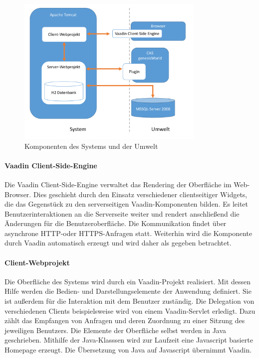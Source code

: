 \begin{figure}[htbp]
\centering
  \includegraphics[width=0.8\textwidth, width=0.8\textwidth]{pics/Konzept_architektur.pdf}
\caption{Komponenten des Systems und der Umwelt}
\label{konzept_architektur}
\end{figure} 

\paragraph{Vaadin Client-Side-Engine}

Die Vaadin Client-Side-Engine verwaltet das Rendering der Oberfläche im Web-Browser.  Dies geschieht durch den Einsatz verschiedener clientseitiger Widgets, die das Gegenstück zu den serverseitigen Vaadin-Komponenten bilden. Es leitet Benutzerinteraktionen an die Serverseite weiter und rendert anschließend die Änderungen für die Benutzeroberfläche. Die Kommunikation findet über asynchrone HTTP-oder HTTPS-Anfragen statt. Weiterhin wird die Komponente durch Vaadin automatisch erzeugt und wird daher als gegeben betrachtet.

\paragraph{Client-Webprojekt}

Die Oberfläche des Systems wird durch ein Vaadin-Projekt realisiert. Mit dessen Hilfe werden die Bedien- und Darstellungselemente der Anwendung definiert. Sie ist außerdem für die Interaktion mit dem Benutzer zuständig. Die Delegation von verschiedenen Clients beispielsweise wird von einem Vaadin-Servlet erledigt. Dazu zählt das Empfangen von Anfragen und deren Zuordnung zu einer Sitzung des jeweiligen Benutzers. Die Elemente der Oberfläche selbst werden in Java geschrieben. Mithilfe der Java-Klasssen wird zur Laufzeit eine Javascript basierte Homepage erzeugt. Die Übersetzung von Java auf Javascript übernimmt Vaadin.

